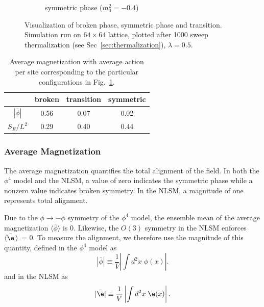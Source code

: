 \begin{figure}[h]
\begin{center}
\begin{subfigure}[b]{0.3\textwidth}
        \caption{symmetric phase ($m_0^2=-0.4$)}
      \end{subfigure}
      \hfill
      \caption{\label{fig:primary observables} Visualization of broken phase, symmetric phase and transition. Simulation run on $64\times64$ lattice, plotted after 1000 sweep thermalization (see Sec~\ref{sec:thermalization}), $\lambda=0.5$.}
  \end{center}
\end{figure}

\begin{table}[h]
    \begin{center}
    {\renewcommand{\arraystretch}{1.2} %
    \begin{tabular}{c c c c}
        \hline\hline & broken & transition & symmetric \\ \hline
        $|\bar\phi|$ & 0.56 & 0.07 & 0.02 \\ 
        $S_E/L^2$ & 0.29 & 0.40 & 0.44  \\ \hline\hline
    \end{tabular}}

    \end{center}
    \caption{\label{tab:primary observables} Average magnetization with average action per site corresponding to the particular configurations in Fig.~\ref{fig:primary observables}.}
\end{table}

\subsubsection{Average Magnetization}
\label{sec:avg mag}
The average magnetization quantifies the total alignment of the field. In both the $\phi^4$ model and the NLSM, a value of zero indicates the symmetric phase while a nonzero value indicates broken symmetry. In the NLSM, a magnitude of one represents total alignment.

Due to the $\phi\rightarrow-\phi$ symmetry of the $\phi^4$ model, the ensemble mean of the average magnetization $\langle \bar\phi \rangle$ is $0$. Likewise, the $O(3)$ symmetry in the NLSM enforces $\langle \bar \e\, \rangle$ = 0. To measure the alignment, we therefore use the magnitude of this quantity, defined in the $\phi^4$ model as 
\begin{equation}
|\bar\phi| \equiv \frac{1}{V}\left| \int d^2x \;\phi(x)\right|.
\end{equation}
and in the NLSM as
\begin{equation}
    \label{eq:chim nlsm}
    |\bar\e| \equiv \frac{1}{V}\left|\int d^2x \;\e(x)\right|.
\end{equation}

